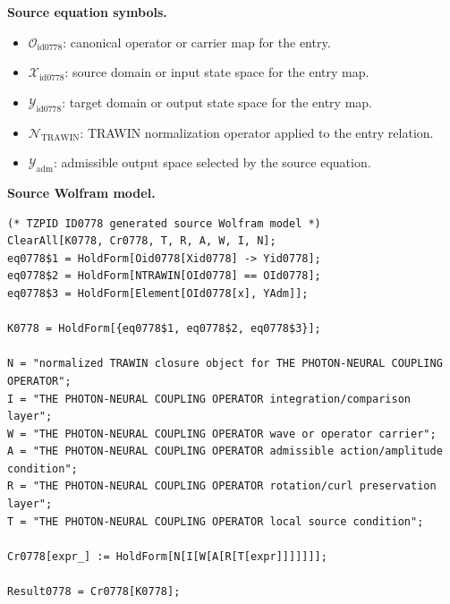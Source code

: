 \begin{minipage}[t]{0.49\linewidth}
\begingroup
\small
\raggedright
\textbf{Source equation symbols.}\par
\begin{itemize}[leftmargin=1.35em,itemsep=1pt,topsep=1pt,parsep=0pt]
    \item $\mathcal{O}_{\mathrm{id0778}}$: canonical operator or carrier map for the entry.
    \item $\mathcal{X}_{\mathrm{id0778}}$: source domain or input state space for the entry map.
    \item $\mathcal{Y}_{\mathrm{id0778}}$: target domain or output state space for the entry map.
    \item $\mathcal{N}_{\mathrm{TRAWIN}}$: TRAWIN normalization operator applied to the entry relation.
    \item $\mathcal{Y}_{\mathrm{adm}}$: admissible output space selected by the source equation.
\end{itemize}
\endgroup
\end{minipage}\hfill
\begin{minipage}[t]{0.47\linewidth}
\begingroup
\scriptsize
\raggedright
\textbf{Source Wolfram model.}\par
\begin{Verbatim}[fontsize=\tiny,breaklines=true,breakanywhere=true]
(* TZPID ID0778 generated source Wolfram model *)
ClearAll[K0778, Cr0778, T, R, A, W, I, N];
eq0778$1 = HoldForm[Oid0778[Xid0778] -> Yid0778];
eq0778$2 = HoldForm[NTRAWIN[OId0778] == OId0778];
eq0778$3 = HoldForm[Element[OId0778[x], YAdm]];

K0778 = HoldForm[{eq0778$1, eq0778$2, eq0778$3}];

N = "normalized TRAWIN closure object for THE PHOTON-NEURAL COUPLING OPERATOR";
I = "THE PHOTON-NEURAL COUPLING OPERATOR integration/comparison layer";
W = "THE PHOTON-NEURAL COUPLING OPERATOR wave or operator carrier";
A = "THE PHOTON-NEURAL COUPLING OPERATOR admissible action/amplitude condition";
R = "THE PHOTON-NEURAL COUPLING OPERATOR rotation/curl preservation layer";
T = "THE PHOTON-NEURAL COUPLING OPERATOR local source condition";

Cr0778[expr_] := HoldForm[N[I[W[A[R[T[expr]]]]]]];

Result0778 = Cr0778[K0778];
\end{Verbatim}
\endgroup
\end{minipage}

